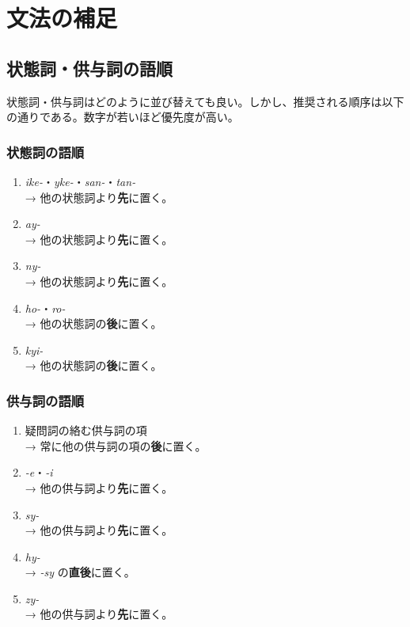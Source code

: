 \chapter{文法の補足}

\section{状態詞・供与詞の語順}

状態詞・供与詞はどのように並び替えても良い。しかし、推奨される順序は以下の通りである。数字が若いほど優先度が高い。

\begin{multicols}{2}
    \subsection{状態詞の語順}

    \begin{enumerate}
        \item \emph{ike-}・\emph{yke-}・\emph{san-}・\emph{tan-} \\ → 他の状態詞より\textbf{先}に置く。
        \item \emph{ay-} \\ → 他の状態詞より\textbf{先}に置く。
        \item \emph{ny-} \\ → 他の状態詞より\textbf{先}に置く。
        \item \emph{ho-}・\emph{ro-} \\ → 他の状態詞の\textbf{後}に置く。
        \item \emph{kyi-} \\ → 他の状態詞の\textbf{後}に置く。
    \end{enumerate}

    \columnbreak

    \subsection{供与詞の語順}

    \begin{enumerate}
        \item 疑問詞の絡む供与詞の項 \\ → 常に他の供与詞の項の\textbf{後}に置く。
        \item \emph{-e}・\emph{-i} \\ → 他の供与詞より\textbf{先}に置く。
        \item \emph{sy-} \\ → 他の供与詞より\textbf{先}に置く。
        \item \emph{hy-} \\ → \emph{-sy} の\textbf{直後}に置く。
        \item \emph{zy-} \\ → 他の供与詞より\textbf{先}に置く。
    \end{enumerate}
\end{multicols}

